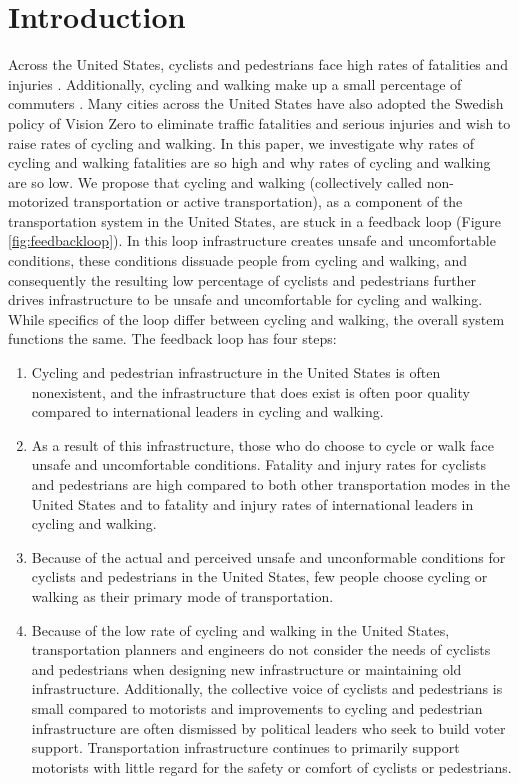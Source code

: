 \documentclass{article}
\begin{document}
\section*{Introduction}
Across the United States, cyclists and pedestrians face high rates of fatalities and injuries \citep{fhwa2016}. Additionally, cycling and walking make up a small percentage of commuters \citep{uscb2016}. Many cities across the United States have also adopted the Swedish policy of Vision Zero to eliminate traffic fatalities and serious injuries and wish to raise rates of cycling and walking. In this paper, we investigate why rates of cycling and walking fatalities are so high and why rates of cycling and walking are so low. We propose that cycling and walking (collectively called non-motorized transportation or active transportation), as a component of the transportation system in the United States, are stuck in a feedback loop (Figure \ref{fig:feedbackloop}). In this loop infrastructure creates unsafe and uncomfortable conditions, these conditions dissuade people from cycling and walking, and consequently the resulting low percentage of cyclists and pedestrians further drives infrastructure to be unsafe and uncomfortable for cycling and walking. While specifics of the loop differ between cycling and walking, the overall system functions the same. The feedback loop has four steps:

\begin{enumerate}
    \item Cycling and pedestrian infrastructure in the United States is often nonexistent, and the infrastructure that does exist is often poor quality compared to international leaders in cycling and walking.
    \item As a result of this infrastructure, those who do choose to cycle or walk face unsafe and uncomfortable conditions. Fatality and injury rates for cyclists and pedestrians are high compared to both other transportation modes in the United States and to fatality and injury rates of international leaders in cycling and walking.
    \item Because of the actual and perceived unsafe and unconformable conditions for cyclists and pedestrians in the United States, few people choose cycling or walking as their primary mode of transportation.
    \item Because of the low rate of cycling and walking in the United States, transportation planners and engineers do not consider the needs of cyclists and pedestrians when designing new infrastructure or maintaining old infrastructure. Additionally, the collective voice of cyclists and pedestrians is small compared to motorists and improvements to cycling and pedestrian infrastructure are often dismissed by political leaders who seek to build voter support. Transportation infrastructure continues to primarily support motorists with little regard for the safety or comfort of cyclists or pedestrians.
\end{enumerate}
\end{document}
